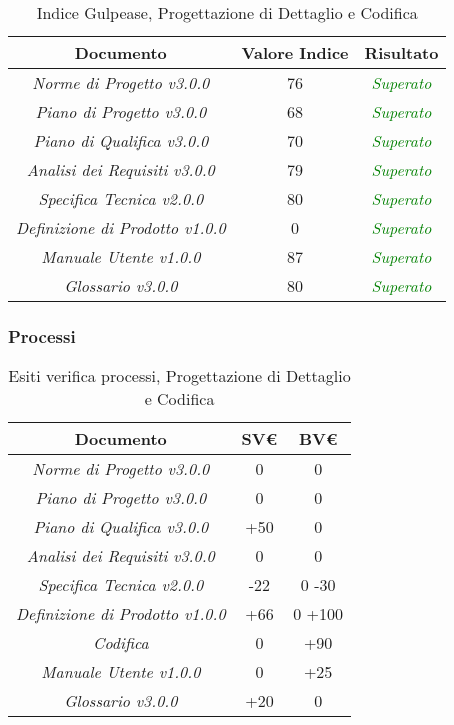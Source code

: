 \hspace{1cm}

\begin{table}[h]
	\begin{tabular}{|c|c|c|}
		\hline 
		\textbf{Documento} & \textbf{Valore Indice} & \textbf{Risultato} \\ 
		\hline
		\textit{Norme di Progetto v3.0.0} & 76 & \textcolor{green}{\textit{Superato}} \\  
		\textit{Piano di Progetto v3.0.0} & 68 & \textcolor{green}{\textit{Superato}} \\ 
		\textit{Piano di Qualifica v3.0.0} & 70 & \textcolor{green}{\textit{Superato}} \\ 
		\textit{Analisi dei Requisiti v3.0.0} & 79 & \textcolor{green}{\textit{Superato}} \\
		\textit{Specifica Tecnica v2.0.0} & 80 & \textcolor{green}{\textit{Superato}} \\ 
		\textit{Definizione di Prodotto v1.0.0} & 0 & \textcolor{green}{\textit{Superato}} \\ 
		\textit{Manuale Utente v1.0.0} & 87 & \textcolor{green}{\textit{Superato}} \\ 
		\textit{Glossario v3.0.0} & 80 & \textcolor{green}{\textit{Superato}} \\ 
		\hline 
\end{tabular}
\caption{Indice Gulpease, Progettazione di Dettaglio e Codifica}
\end{table}

\subsubsection{Processi}
\label{appendice 6}
\vspace{3mm}

\begin{table}[h]
	\begin{tabular}{|c|c|c|}
		\toprule
			\textbf{Documento} & \textbf{SV\euro} & \textbf{BV\euro} \\ 
		\midrule
		\midrule
			\textit{Norme di Progetto v3.0.0} & 0 & 0 \\  
			\textit{Piano di Progetto v3.0.0} & 0 & 0 \\ 
			\textit{Piano di Qualifica v3.0.0} & +50 & 0 \\ 
			\textit{Analisi dei Requisiti v3.0.0} & 0 & 0 \\
			\textit{Specifica Tecnica v2.0.0} & -22 & 0 -30\\ 
			\textit{Definizione di Prodotto v1.0.0} & +66 & 0 +100\\
			\textit{Codifica} & 0 & +90 \\
			\textit{Manuale Utente v1.0.0} & 0 & +25\\
			\textit{Glossario v3.0.0} & +20 & 0 \\ 
		\bottomrule
	\end{tabular}
\caption{Esiti verifica processi, Progettazione di Dettaglio e Codifica}
\end{table}


